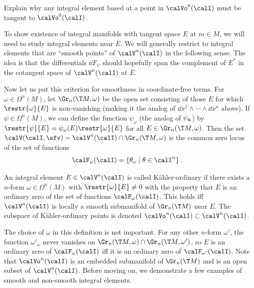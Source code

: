 \begin{xca}
    Explain why any integral element based at a point in $\calVo^0(\calI)$ must be tangent to $\calVo^0(\calI)$.
\end{xca}

To show existence of integral manifolds with tangent space $E$ at $m\in M$, we will need to study integral elements near $E$. We will generally restrict to integral elements that are ``smooth points'' of $\calV^n(\calI)$ in the following sense. The idea is that the differentials $\dd F_\psi$ should hopefully span the complement of $E^\ast$ in the cotangent space of $\calV^n(\calI)$ at $E$.

Now let us put this criterion for smoothness in coordinate-free terms. For $\omega\in\Omega^n(M)$, let $\Gr_n(\T M,\omega)$ be the open set consisting of those $E$ for which $\restr{\omega}{E}$ is non-vanishing (making it the analog of $\dd x^1\wedge\cdots \wedge\dd x^n$ above). If $\psi\in\Omega^n(M)$, we can define the function $\psi_\omega$ (the analog of $\psi_{\bf{x}}$) by $\restr{\psi}{E}=\psi_\omega(E)\restr{\omega}{E}$ for all $E\in\Gr_n(\T M,\omega)$. Then the set $\calV(\calI,\sfv)=\calV^n(\calI)\cap \Gr_n(\T M,\omega)$ is the common zero locus of the set of functions 
\[\calF_\omega(\calI)=\left\{\theta_\omega\mid \theta\in\calI^n\right\}.\]

\begin{defn}
    An integral element $E\in\calV^n(\calI)$ is called K\"ahler-ordinary if there exists a $n$-form $\omega\in\Omega^n(M)$ with $\restr{\omega}{E}\neq 0$ with the property that $E$ is an ordinary zero of the set of functions $\calF_\omega(\calI)$. This holds iff $\calV^n(\calI)$ is locally a smooth submanifold of $\Gr_n (\T M)$ near $E$. The subspace of K\"ahler-ordinary points is denoted $\calVo^n(\calI)\subset\calV^n(\calI)$.
\end{defn}

The choice of $\omega$ in this definition is not important. For any other $n$-form $\omega'$, the function $\omega'_{\omega}$ never vanishes on $\Gr_n(\T M,\omega)\cap\Gr_n(\T M,\omega')$, so $E$ is an ordinary zero of $\calF_\omega(\calI)$ iff it is an ordinary zero of $\calF_{\omega'}(\calI)$. Note that $\calVo^n(\calI)$ is an embedded submanifold of $\Gr_n(\T M)$ and is an open subset of $\calV^n(\calI)$. Before moving on, we demonstrate a few examples of smooth and non-smooth integral elements.


